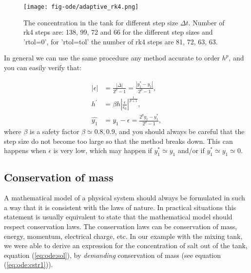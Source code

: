 \documentclass[graybox,sectrefs,envcountresetchap,open=right,final]{svmonodo}
\newenvironment{graybox2admon}[1][]{
\begin{graybox2mdframed}[frametitle=#1]
}
{
\end{graybox2mdframed}
}
\begin{document}
\begin{figure}[!ht]  %
  \centerline{\texttt{[image: fig-ode/adaptive\_rk4.png]}}
  \caption{
  The concentration in the tank for different step size $\Delta t$. Number of rk4 steps are: 138, 99, 72 and 66 for the different step sizes and 'rtol=0', for 'rtol=tol' the number of rk4 steps are 81, 72, 63, 63.\label{fig:ode:adaptive_rk4}
  }
\end{figure}


In general we can use the same procedure any method accurate to order $h^p$, and you can easily verify that:


\begin{graybox2admon}[Error term and step size for a $h^p$ method:]
\begin{align}
|\epsilon|&=\frac{|\Delta|}{2^p-1}=\frac{|y_1^*-y_1|}{2^p-1},\label{eq:eode:1}\\ 
h^\prime&=\beta h\left|\frac{\epsilon}{\epsilon_0}\right|^{\frac{1}{p+1}},\label{eq:eode:2}\\ 
\hat{y_1}&=y_1-\epsilon=\frac{2^p y_1-y_1^*}{2^{p}-1}\label{eq:eode:3},
\end{align}
where $\beta$ is a safety factor $\beta\simeq0.8,0.9$, and you should always be careful that the step size do not become too large so that
the method breaks down. This can happens when $\epsilon$ is very low, which may happen if $y_1^*\simeq y_1$ and/or if $y_1^*\simeq y_1\simeq 0$.
\end{graybox2admon}




\subsection{Conservation of mass}
A mathematical model of a physical system should always be formulated in such a way that it is
consistent with the laws of nature. In practical situations this statement is usually equivalent to state that
the mathematical model should respect conservation laws. The conservation laws can be conservation of mass, energy, momentum, 
electrical charge, etc. In our
example with the mixing tank, we were able to derive an expression for the concentration of salt out of
the tank, equation (\ref{eq:ode:sol}), by \emph{demanding} conservation of mass (see equation (\ref{eq:ode:cstr1})).
\end{document}
